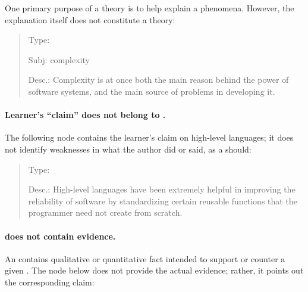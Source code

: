 One primary purpose of a theory is to help explain a phenomena.  However,
the explanation itself does not constitute a theory:

\small
\begin{quote}
  \begin{itemizenoindent}

  \item {\sf Type}: 
 
  \item {\sf Subj}: complexity
 
  \item {\sf Desc.}: Complexity is at once both the main
    reason behind the power of software systems, and the
    main source of problems in developing it.
 \end{itemizenoindent}
\end{quote}
\normalsize
{}

\paragraph{Learner's ``claim'' does not belong to .}

The following node contains the learner's claim on high-level languages; it
does not identify weaknesses in what the author did or said, as a
 should:

\small
\begin{quote}
  \begin{itemizenoindent}

\item {\sf Type}: 
 
\item {\sf Desc.}: High-level languages have been extremely helpful in
  improving the reliability of software by standardizing certain reusable
  functions that the programmer need not create from scratch.
 \end{itemizenoindent}
\end{quote}
\normalsize
{}


\paragraph{ does not contain evidence.}

An  contains qualitative or quantitative fact intended
to support or counter a given .  The  node below does not provide the actual evidence; rather, it
points out the corresponding claim:


